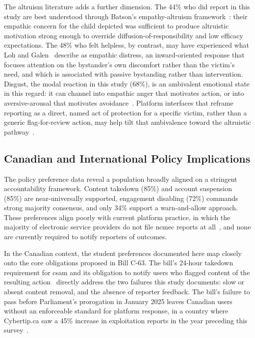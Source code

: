 \documentclass{ieee-portfolio}
\begin{document}
The altruism literature adds a further dimension. The 44\% who did report in this study are best understood through Batson's empathy-altruism framework~\cite{batson_altruism_2011}: their empathic concern for the child depicted was sufficient to produce altruistic motivation strong enough to override diffusion-of-responsibility and low efficacy expectations. The 48\% who felt helpless, by contrast, may have experienced what Loh and Galen~\cite{steinvik_bystanders_2023} describe as empathic distress, an inward-oriented response that focuses attention on the bystander's own discomfort rather than the victim's need, and which is associated with passive bystanding rather than intervention. Disgust, the modal reaction in this study (68\%), is an ambivalent emotional state in this regard: it can channel into empathic anger that motivates action, or into aversive-arousal that motivates avoidance~\cite{steinvik_bystanders_2023}. Platform interfaces that reframe reporting as a direct, named act of protection for a specific victim, rather than a generic flag-for-review action, may help tilt that ambivalence toward the altruistic pathway~\cite{scaffidi_prosocial_2022}.
 
\subsection{Canadian and International Policy Implications}
 
The policy preference data reveal a population broadly aligned on a stringent accountability framework. Content takedown (85\%) and account suspension (85\%) are near-universally supported, engagement disabling (72\%) commands strong majority consensus, and only 34\% support a warn-and-allow approach. These preferences align poorly with current platform practice, in which the majority of electronic service providers do not file \gls{ncmec} reports at all~\cite{ncmec_2023}, and none are currently required to notify reporters of outcomes.
 
In the Canadian context, the student preferences documented here map closely onto the core obligations proposed in Bill C-63. The bill's 24-hour takedown requirement for \gls{csam} and its obligation to notify users who flagged content of the resulting action~\cite{gc_c63_2024} directly address the two failures this study documents: slow or absent content removal, and the absence of reporter feedback. The bill's failure to pass before Parliament's prorogation in January 2025 leaves Canadian users without an enforceable standard for platform response, in a country where Cybertip.ca saw a 45\% increase in exploitation reports in the year preceding this survey~\cite{cybertip_2023}.
 
\end{document}
